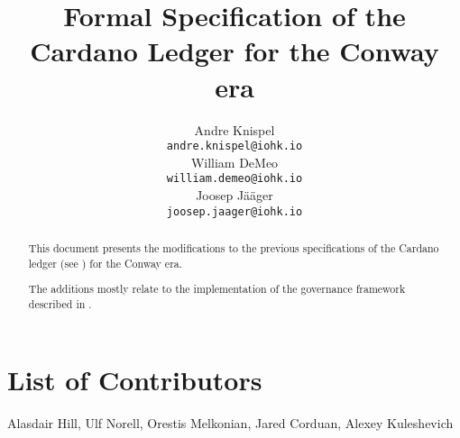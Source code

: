 \documentclass[11pt,a4paper,dvipsnames]{article}
\begin{document}
\title{Formal Specification of the Cardano Ledger for the Conway era}

\author{
   Andre Knispel \\ {\small \texttt{andre.knispel@iohk.io}} \\
   William DeMeo \\ {\small \texttt{william.demeo@iohk.io}} \\
   Joosep Jääger \\ {\small \texttt{joosep.jaager@iohk.io}} \\
   }

\date{}

\maketitle

\begin{abstract}
  This document presents the modifications to the previous
  specifications of the Cardano ledger (see
  \cite{shelley-ledger-spec,shelley-ma-ledger-spec,alonzo-ledger-spec,babbage-ledger-spec})
  for the Conway era.

  The additions mostly relate to the implementation of the governance
  framework described in \cite{cip1694}.
\end{abstract}

\section*{List of Contributors}
\label{acknowledgements}

Alasdair Hill, Ulf Norell, Orestis Melkonian, Jared Corduan, Alexey Kuleshevich

\tableofcontents



















\clearpage

\appendix




\end{document}
